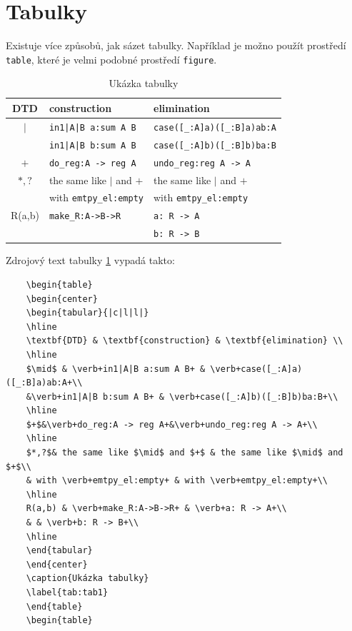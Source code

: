 \documentclass[11pt,twoside,a4paper]{book}
\begin{document}
	\section{Tabulky}
	Existuje více způsobů, jak sázet tabulky. Například je možno použít prostředí \verb|table|, které je velmi podobné prostředí \verb|figure|. 
	
	\begin{table}
		\begin{center}
			\begin{tabular}{|c|l|l|}
				\hline
				\textbf{DTD} & \textbf{construction} & \textbf{elimination} \\
				\hline
				$\mid$ & \verb+in1|A|B a:sum A B+ & \verb+case([_:A]a)([_:B]a)ab:A+\\
				&\verb+in1|A|B b:sum A B+ & \verb+case([_:A]b)([_:B]b)ba:B+\\
				\hline
				$+$&\verb+do_reg:A -> reg A+&\verb+undo_reg:reg A -> A+\\
				\hline
				$*,?$& the same like $\mid$ and $+$ & the same like $\mid$ and $+$\\
				& with \verb+emtpy_el:empty+ & with \verb+emtpy_el:empty+\\
				\hline
				R(a,b) & \verb+make_R:A->B->R+ & \verb+a: R -> A+\\
				& & \verb+b: R -> B+\\
				\hline
			\end{tabular}
		\end{center}
		\caption{Ukázka tabulky}
		\label{tab:tab1}
	\end{table}
	
	Zdrojový text tabulky \ref{tab:tab1} vypadá takto:
	\begin{verbatim}
	\begin{table}
	\begin{center}
	\begin{tabular}{|c|l|l|}
	\hline
	\textbf{DTD} & \textbf{construction} & \textbf{elimination} \\
	\hline
	$\mid$ & \verb+in1|A|B a:sum A B+ & \verb+case([_:A]a)([_:B]a)ab:A+\\
	&\verb+in1|A|B b:sum A B+ & \verb+case([_:A]b)([_:B]b)ba:B+\\
	\hline
	$+$&\verb+do_reg:A -> reg A+&\verb+undo_reg:reg A -> A+\\
	\hline
	$*,?$& the same like $\mid$ and $+$ & the same like $\mid$ and $+$\\
	& with \verb+emtpy_el:empty+ & with \verb+emtpy_el:empty+\\
	\hline
	R(a,b) & \verb+make_R:A->B->R+ & \verb+a: R -> A+\\
	& & \verb+b: R -> B+\\
	\hline
	\end{tabular}
	\end{center}
	\caption{Ukázka tabulky}
	\label{tab:tab1}
	\end{table}
	\begin{table}
	\end{verbatim}
	
\end{document}
